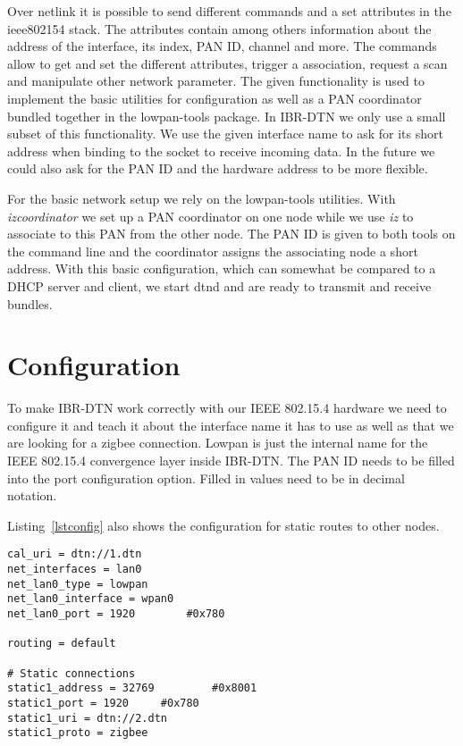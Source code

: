 Over netlink it is possible to send different commands and a set attributes in the
ieee802154 stack. The attributes contain among others information about the
address of the interface, its index, PAN ID, channel and more. The commands
allow to get and set the different attributes, trigger a association, request a
scan and manipulate other network parameter. The given functionality is used to
implement the basic utilities for configuration as well as a PAN coordinator
bundled together in the lowpan-tools package. In IBR-DTN we only use a small subset of this
functionality. We use the given interface name to ask for its short address when
binding to the socket to receive incoming data. In the future we could also ask for
the PAN ID and the hardware address to be more flexible.

For the basic network setup we rely on the lowpan-tools utilities. With
\emph{izcoordinator} we set up a PAN coordinator on one
node while we use \emph{iz} to associate to this PAN from the other node. The PAN ID is
given to both tools on the command line and the coordinator assigns the
associating node a short address. With this basic configuration, which can
somewhat be compared to a DHCP server and client, we start dtnd and are ready to
transmit and receive bundles.

\section{Configuration}

To make IBR-DTN work correctly with our IEEE 802.15.4 hardware we need to configure
it and teach it about the interface name it has to use as well as that we are
looking for a zigbee connection. Lowpan is just the internal name for the
IEEE 802.15.4 convergence layer inside IBR-DTN. The PAN ID needs to be filled into the
port configuration option. Filled in values need to be in decimal notation.

Listing~\ref{lstconfig} also shows the configuration for static routes to other
nodes.

\begin{lstlisting}[caption= dtnd example configuration, label=lstconfig]
cal_uri = dtn://1.dtn
net_interfaces = lan0
net_lan0_type = lowpan
net_lan0_interface = wpan0
net_lan0_port = 1920		#0x780

routing = default

# Static connections
static1_address = 32769         #0x8001
static1_port = 1920		#0x780
static1_uri = dtn://2.dtn
static1_proto = zigbee
\end{lstlisting}

